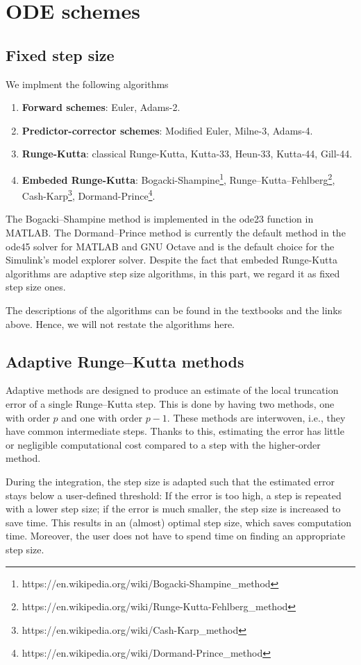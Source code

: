\documentclass[conference,onecolumn,12pt]{IEEEtran}
\begin{document}
\section{ODE schemes}
\subsection{Fixed step size}
We implment the following algorithms
\begin{enumerate}
    \item {\bf Forward schemes}: Euler, Adams-2.
    \item {\bf Predictor-corrector schemes}: Modified Euler, Milne-3, Adams-4. 
    \item {\bf Runge-Kutta}: classical Runge-Kutta, Kutta-33, Heun-33, Kutta-44, Gill-44.
    \item {\bf Embeded Runge-Kutta}: Bogacki-Shampine\footnote{https://en.wikipedia.org/wiki/Bogacki-Shampine\_method}, Runge–Kutta–Fehlberg\footnote{https://en.wikipedia.org/wiki/Runge-Kutta-Fehlberg\_method}, Cash-Karp\footnote{https://en.wikipedia.org/wiki/Cash-Karp\_method}, Dormand-Prince\footnote{https://en.wikipedia.org/wiki/Dormand-Prince\_method}.
\end{enumerate}

The Bogacki–Shampine method is implemented in the ode23 function in MATLAB. The Dormand–Prince method is currently the default method in the ode45 solver for MATLAB and GNU Octave and is the default choice for the Simulink's model explorer solver. Despite the fact that embeded Runge-Kutta algorithms are adaptive step size algorithms, in this part, we regard it as fixed step size ones.

The descriptions of the algorithms can be found in the textbooks and the links above. Hence, we will not restate the algorithms here.

\subsection{Adaptive Runge–Kutta methods}
Adaptive methods are designed to produce an estimate of the local truncation error of a single Runge–Kutta step. This is done by having two methods, one with order $p$ and one with order $p - 1$. These methods are interwoven, i.e., they have common intermediate steps. Thanks to this, estimating the error has little or negligible computational cost compared to a step with the higher-order method.

During the integration, the step size is adapted such that the estimated error stays below a user-defined threshold: If the error is too high, a step is repeated with a lower step size; if the error is much smaller, the step size is increased to save time. This results in an (almost) optimal step size, which saves computation time. Moreover, the user does not have to spend time on finding an appropriate step size.
\end{document}

